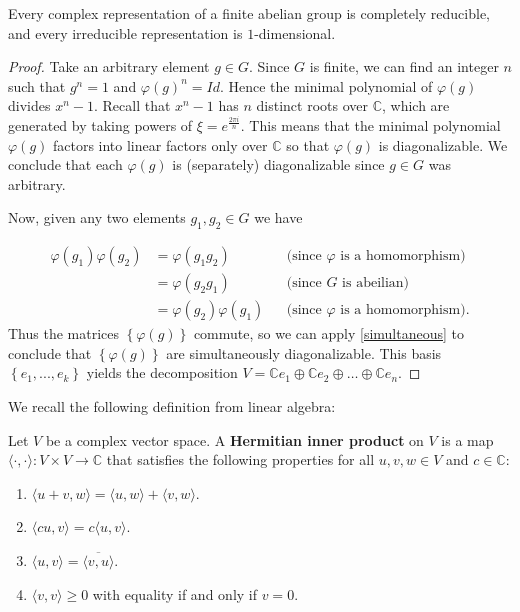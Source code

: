 \begin{thm} Every complex representation of a finite abelian group is completely reducible, and every irreducible representation is $1$-dimensional.  
\end {thm}
\begin{proof}
Take an arbitrary element $g \in G$.  Since $G$ is finite, we can find an integer $n$ such that $g^n = 1$ and $\varphi(g)^n = Id$.    Hence the minimal polynomial of $\varphi(g)$ divides  $x^n -1$.  Recall that $x^n-1$ has $n$ distinct roots over $\mathbb{C}$, which are generated by taking powers of $\xi = e^{\frac{2 \pi i}{n}}$.  This means that the minimal polynomial $\varphi(g)$ factors into linear factors only over $\mathbb{C}$ so that $\varphi(g)$ is diagonalizable.  We conclude that each $\varphi(g)$ is (separately) diagonalizable since $g \in G$ was arbitrary.

Now, given any two elements $g_1, g_2 \in G$ we have 

\begin{align*}
\varphi(g_1) \varphi(g_2)&= \varphi(g_1 g_2)&& \text{(since $\varphi$ is a homomorphism)} \\
		&=  \varphi(g_2 g_1) && \text{(since $G$ is abeilian)} \\
		&= \varphi(g_2) \varphi(g_1) && \text{(since $\varphi$ is a homomorphism)}.
\end{align*}
Thus the matrices $\left\{ \varphi(g)\right\}$ commute, so we can apply \ref{simultaneous} to conclude that $\left\{ \varphi(g)\right\}$ are simultaneously diagonalizable. This basis $\left\{ e_1, ..., e_k \right\}$ yields the decomposition $V= \mathbb{C}e_1 \oplus \mathbb{C} e_2 \oplus \ldots \oplus \mathbb{C} e_n$.
\end{proof}

We recall the following definition from linear algebra:
\begin{defn}
Let $V$ be a complex vector space.  A \textbf{Hermitian inner product} on $V$ is a map $\langle \cdot{,}\cdot \rangle \colon  V \times V \to \mathbb{C}$ that satisfies the following properties for all  $u, v, w \in V$ and $c \in \mathbb{C}$:
\begin{enumerate}
\item  $\langle u + v, w \rangle = \langle u , w \rangle + \langle v, w \rangle$.
\item $\langle c u, v \rangle = c \langle u, v \rangle$.
\item $\langle u , v \rangle = \overline{\langle v , u \rangle }$.
\item $\langle v, v \rangle \geq 0$ with equality if and only if $v = 0$.
\end{enumerate}
\end{defn}

